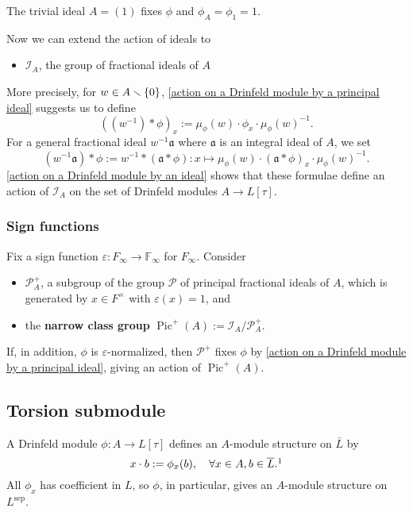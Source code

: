 \documentclass{article}
\newcommand{\F}{\mathbb{F}}
\newcommand{\sep}{\mathrm{sep}}
\DeclareMathOperator{\pic}{Pic}
\begin{document}
\begin{example}
    The trivial ideal $A = (1)$ fixes $\phi$ and $\phi_A = \phi_1 = 1$.
\end{example}

Now we can extend the action of ideals to
\begin{itemize}
    \item   $\mathcal{I}_A$, the group of fractional ideals of $A$
\end{itemize}
More precisely,
for $w\in A\smallsetminus \{0\}$,
\cref{action on a Drinfeld module by a principal ideal} suggests us to define
\[\left( (w^{-1})*\phi \right)_x := \mu_\phi(w)\cdot\phi_x\cdot \mu_{\phi}(w)^{-1}.\]
For a general fractional ideal $w^{-1}\mathfrak{a}$
where $\mathfrak{a}$ is an integral ideal of $A$,
we set \[(w^{-1}\mathfrak{a}) * \phi := w^{-1} * (\mathfrak{a} * \phi) : x\mapsto \mu_\phi(w)\cdot (\mathfrak{a} * \phi)_x\cdot \mu_\phi(w)^{-1}.\]
\cref{action on a Drinfeld module by an ideal} shows that these formulae define an action of $\mathcal{I}_A$
on the set of Drinfeld modules $A\to L[\tau]$.


\subsubsection{Sign functions}
Fix a sign function $\varepsilon : F_\infty\to\F_\infty$ for $F_\infty$.
Consider \begin{itemize}

    \item $\mathcal{P}^+_A$, a subgroup of the group $\mathcal{P}$ of principal fractional ideals of $A$, which is generated by $x\in F^\times$ with $\varepsilon(x) = 1$, and
    \item the \textbf{narrow class group} $\pic^+(A) := \mathcal{I}_A/\mathcal{P}^+_A$.
\end{itemize}
If, in addition, $\phi$ is $\varepsilon$-normalized,
then $\mathcal{P}^+$ fixes $\phi$ by \cref{action on a Drinfeld module by a principal ideal},
giving an action of $\pic^+(A)$.

\subsection{Torsion submodule}
A Drinfeld module $\phi : A\to L[\tau]$
defines an $A$-module structure on $\bar L$ by\[x\cdot b := \phi_x(b),\quad\forall x\in A, b\in\bar L.\footnotemark\]
All $\phi_x$ has coefficient in $L$, so $\phi$, in particular, gives an $A$-module structure on $L^\sep$.
\end{document}
